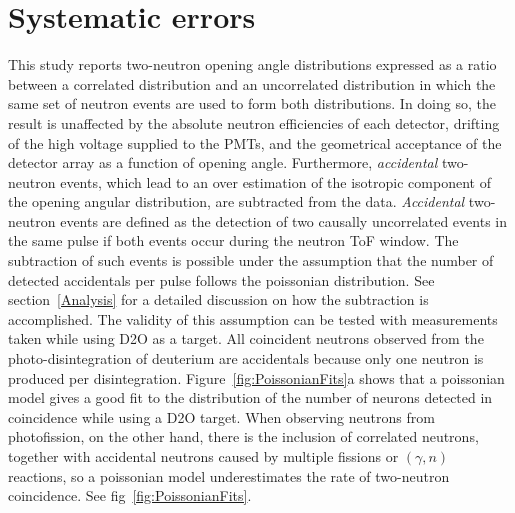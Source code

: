 \section{Systematic errors}
This study reports two-neutron opening angle distributions expressed as a ratio between a correlated distribution and an uncorrelated distribution in which the same set of neutron events are used to form both distributions.
In doing so, the result is unaffected by the absolute neutron efficiencies of each detector, drifting of the high voltage supplied to the PMTs, and the geometrical acceptance of the detector array as a function of opening angle.
Furthermore, \textit{accidental} two-neutron events, which lead to an over estimation of the isotropic component of the opening angular distribution, are subtracted from the data.
\textit{Accidental} two-neutron events are defined as the detection of two causally uncorrelated events in the same pulse if both events occur during the neutron ToF window.
The subtraction of such events is possible under the assumption that the number of detected accidentals per pulse follows the poissonian distribution.
See section~\ref{Analysis} for a detailed discussion on how the subtraction is accomplished.
The validity of this assumption can be tested with measurements taken while using D2O as a target.
All coincident neutrons observed from the photo-disintegration of deuterium are accidentals because only one neutron is produced per disintegration.
Figure~\ref{fig:PoissonianFits}a shows that a poissonian model gives a good fit to the distribution of the number of neurons detected in coincidence while using a D2O target.
When observing neutrons from photofission, on the other hand, there is the inclusion of correlated neutrons, together with accidental neutrons caused by multiple fissions or $(\gamma, n)$ reactions, so a poissonian model underestimates the rate of two-neutron coincidence.
See fig~\ref{fig:PoissonianFits}.
